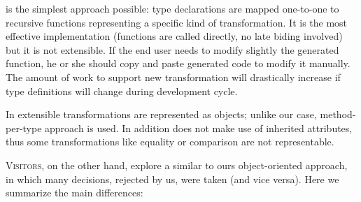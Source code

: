  is the simplest approach possible: type declarations are mapped one-to-one to recursive functions representing a specific kind of transformation. It is the most effective implementation (functions are called directly, no late biding involved) but it is not extensible. If the end user needs to modify slightly the generated function, he or she should copy and paste generated code to modify it manually. The amount of work to support new transformation will drastically increase if type definitions will change during development cycle.

In  extensible transformations are represented as objects; unlike our case, method-per-type approach is used. In addition 
 does not make use of inherited attributes, thus some transformations like equality or comparison are not representable.

\textsc{Visitors}, on the other hand, explore a similar to ours object-oriented approach, in which many decisions, rejected by us, were taken (and vice versa). Here
we summarize the main differences:

